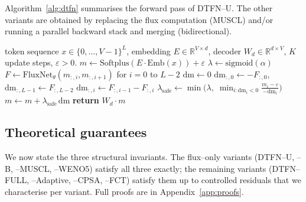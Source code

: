 \documentclass[10pt]{article}
\theoremstyle{definition}
\theoremstyle{remark}
\newcommand{\R}{\mathbb{R}}
\newcommand{\Eps}{\varepsilon}
\newcommand{\FluxNet}{\mathrm{FluxNet}}
\begin{document}
Algorithm~\ref{alg:dtfn} summarises the forward pass of DTFN--U.  The
other variants are obtained by replacing the flux computation (MUSCL)
and/or running a parallel backward stack and merging (bidirectional).

\begin{algorithm}[t]
  \caption{DTFN--U forward pass.  All operations are differentiable;
    $\FluxNet_\theta$ has non--negative output by Softplus, and the
    positivity step ensures $p\ge\Eps$ without breaking conservation.}
  \label{alg:dtfn}
  \begin{algorithmic}[1]
    \Require token sequence $x\in\{0,\dots,V-1\}^L$, embedding $E\in\R^{V\times d}$,
    decoder $W_d\in\R^{d\times V}$, $K$ update steps, $\Eps>0$.
    \State $m \gets \mathrm{Softplus}(E\cdot \mathrm{Emb}(x)) + \Eps$ 
    \State $\lambda \gets \mathrm{sigmoid}(\alpha)$ 
      \State $F \gets \FluxNet_\theta(m_{:,i}, m_{:,i+1})$ for $i=0$ to $L-2$ 
      \State $\mathrm{dm} \gets 0$
      \State $\mathrm{dm}_{:,0} \gets -F_{:,0}$, $\mathrm{dm}_{:,L-1} \gets F_{:,L-2}$ 
        \State $\mathrm{dm}_{:,i} \gets F_{:,i-1} - F_{:,i}$
      \EndFor
      \State $\lambda_\text{safe} \gets \min\!\bigl(\lambda,\;\min_{i:\mathrm{dm}_i<0}\tfrac{m_i - \Eps}{-\mathrm{dm}_i}\bigr)$ 
      \State $m \gets m + \lambda_\text{safe}\,\mathrm{dm}$
    \EndFor
    \State \textbf{return} $W_d \cdot m$ 
  \end{algorithmic}
\end{algorithm}

\subsection{Theoretical guarantees}
\label{sec:theory}

We now state the three structural invariants.  The flux--only
variants (DTFN--U, --B, --MUSCL, --WENO5) satisfy all three exactly;
the remaining variants (DTFN--FULL, --Adaptive, --CPSA, --FCT)
satisfy them up to controlled residuals that we characterise per
variant.  Full proofs are in Appendix~\ref{app:proofs}.
\end{document}
